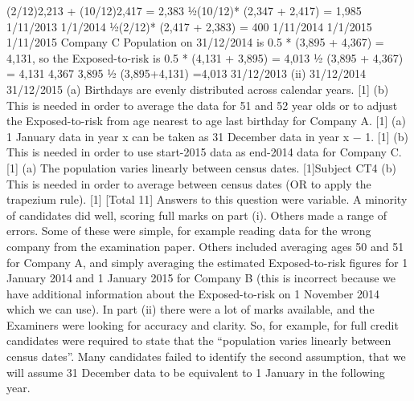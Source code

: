 \documentclass[a4paper,12pt]{article}
\begin{document}
(2/12)2,213 + (10/12)2,417
= 2,383
1⁄2(10/12)*
(2,347 + 2,417)
= 1,985
1/11/2013
1/1/2014
1⁄2(2/12)*
(2,417 + 2,383)
= 400
1/11/2014
1/1/2015
1/11/2015
Company C
Population on 31/12/2014 is 0.5 * (3,895 + 4,367) = 4,131, 
so the Exposed-to-risk is 0.5 * (4,131 + 3,895) = 4,013 
1⁄2 (3,895 + 4,367)
= 4,131
4,367
3,895
1⁄2 (3,895+4,131)
=4,013
31/12/2013
(ii)
31/12/2014
31/12/2015
(a) Birthdays are evenly distributed across calendar years. [1]
(b) This is needed in order to average the data for 51 and 52 year olds or
to adjust the Exposed-to-risk from age nearest to age last birthday for
Company A. [1]
(a) 1 January data in year x can be taken as 31 December data in year x − 1. [1]
(b) This is needed in order to use start-2015 data as end-2014 data for Company
C.
[1]
(a) The population varies linearly between census dates.
[1]Subject CT4 %
(b)
This is needed in order to average between census dates (OR to apply the
trapezium rule).
[1]
[Total 11]
\newpage
Answers to this question were variable. A minority of candidates did well,
scoring full marks on part (i). Others made a range of errors. Some of these
were simple, for example reading data for the wrong company from the
examination paper. Others included averaging ages 50 and 51 for Company
A, and simply averaging the estimated Exposed-to-risk figures for 1 January
2014 and 1 January 2015 for Company B (this is incorrect because we have
additional information about the Exposed-to-risk on 1 November 2014 which
we can use). In part (ii) there were a lot of marks available, and the
Examiners were looking for accuracy and clarity. So, for example, for full
credit candidates were required to state that the “population varies linearly
between census dates”. Many candidates failed to identify the second
assumption, that we will assume 31 December data to be equivalent to
1 January in the following year.
\end{document}
